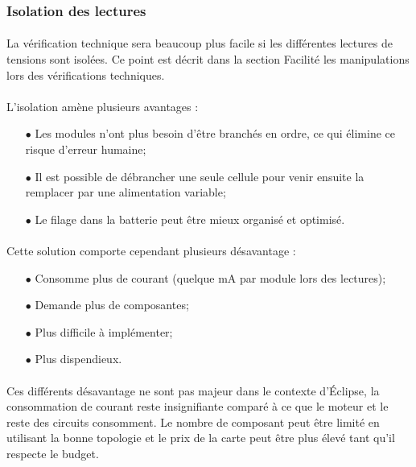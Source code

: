 	\newpage
	
	\subsubsection*{Isolation des lectures}
	\paragraph*{}
	La vérification technique sera beaucoup plus facile si les différentes lectures de tensions sont isolées. Ce point est décrit dans la section Facilité les manipulations lors des vérifications techniques. 
	
	\paragraph*{}
	L'isolation amène plusieurs avantages :
	
	\begin{itemize}
		\item[$\bullet$] Les modules n'ont plus besoin d'être branchés en ordre, ce qui élimine ce risque d'erreur humaine;
		\item[$\bullet$] Il est possible de débrancher une seule cellule pour venir ensuite la remplacer par une alimentation variable;
		\item[$\bullet$] Le filage dans la batterie peut être mieux organisé et optimisé.
	\end{itemize}

	\paragraph*{}
	Cette solution comporte cependant plusieurs désavantage :
	
	\begin{itemize}
		\item[$\bullet$] Consomme plus de courant (quelque mA par module lors des lectures);
		\item[$\bullet$] Demande plus de composantes;
		\item[$\bullet$] Plus difficile à implémenter;
		\item[$\bullet$] Plus dispendieux.
	\end{itemize}
	
	\paragraph*{}
	Ces différents désavantage ne sont pas majeur dans le contexte d'Éclipse, la consommation de courant reste insignifiante comparé à ce que le moteur et le reste des circuits consomment. Le nombre de composant peut être limité en utilisant la bonne topologie et le prix de la carte peut être plus élevé tant qu'il respecte le budget. 
	

